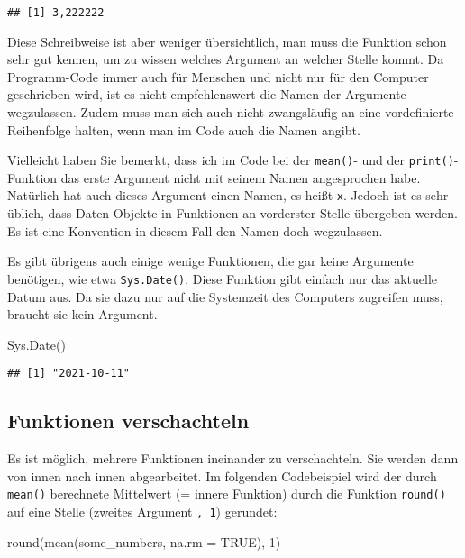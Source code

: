 \documentclass[
]{book}
\newenvironment{Shaded}{\begin{snugshade}}{\end{snugshade}}
\newcommand{\AttributeTok}[1]{\textcolor[rgb]{0.77,0.63,0.00}{#1}}
\newcommand{\ConstantTok}[1]{\textcolor[rgb]{0.00,0.00,0.00}{#1}}
\newcommand{\DecValTok}[1]{\textcolor[rgb]{0.00,0.00,0.81}{#1}}
\newcommand{\FunctionTok}[1]{\textcolor[rgb]{0.00,0.00,0.00}{#1}}
\newcommand{\NormalTok}[1]{#1}
\begin{document}
\begin{verbatim}
## [1] 3,222222
\end{verbatim}

Diese Schreibweise ist aber weniger übersichtlich, man muss die Funktion schon sehr gut kennen, um zu wissen welches Argument an welcher Stelle kommt. Da Programm-Code immer auch für Menschen und nicht nur für den Computer geschrieben wird, ist es nicht empfehlenswert die Namen der Argumente wegzulassen. Zudem muss man sich auch nicht zwangsläufig an eine vordefinierte Reihenfolge halten, wenn man im Code auch die Namen angibt.

Vielleicht haben Sie bemerkt, dass ich im Code bei der \texttt{mean()}- und der \texttt{print()}-Funktion das erste Argument nicht mit seinem Namen angesprochen habe. Natürlich hat auch dieses Argument einen Namen, es heißt \texttt{x}. Jedoch ist es sehr üblich, dass Daten-Objekte in Funktionen an vorderster Stelle übergeben werden. Es ist eine Konvention in diesem Fall den Namen doch wegzulassen.

Es gibt übrigens auch einige wenige Funktionen, die gar keine Argumente benötigen, wie etwa \texttt{Sys.Date()}. Diese Funktion gibt einfach nur das aktuelle Datum aus. Da sie dazu nur auf die Systemzeit des Computers zugreifen muss, braucht sie kein Argument.

\begin{Shaded}
\begin{Highlighting}[]
\FunctionTok{Sys.Date}\NormalTok{()}
\end{Highlighting}
\end{Shaded}

\begin{verbatim}
## [1] "2021-10-11"
\end{verbatim}

\hypertarget{funktionen-verschachteln}{%
\subsection{Funktionen verschachteln}\label{funktionen-verschachteln}}

Es ist möglich, mehrere Funktionen ineinander zu verschachteln. Sie werden dann von innen nach innen abgearbeitet. Im folgenden Codebeispiel wird der durch \texttt{mean()} berechnete Mittelwert (= innere Funktion) durch die Funktion \texttt{round()} auf eine Stelle (zweites Argument \texttt{,\ 1}) gerundet:

\begin{Shaded}
\begin{Highlighting}[]
\FunctionTok{round}\NormalTok{(}\FunctionTok{mean}\NormalTok{(some\_numbers, }\AttributeTok{na.rm =} \ConstantTok{TRUE}\NormalTok{), }\DecValTok{1}\NormalTok{)}
\end{Highlighting}
\end{Shaded}
\end{document}
